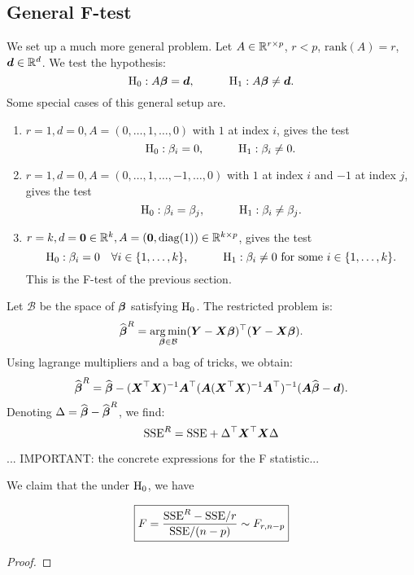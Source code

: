 \subsection{General F-test}
We set up a much more general problem. Let $A\in\mathbb{R}^{r\times p}$, $r<p$, $\mathrm{rank}(A)=r$, $\boldsymbol{d}\in\mathbb{R}^d$. We test the hypothesis:
$$
    \mathrm{H}_0 : A\boldsymbol{\beta} = \boldsymbol{d}, 
    \quad\quad\quad
    \mathrm{H}_1 : A\boldsymbol{\beta} \ne \boldsymbol{d}.
$$
Some special cases of this general setup are.
\begin{enumerate}[label=\textbullet]
    \item $r=1, d=0, A=(0, \dots, 1, \dots, 0)$ with $1$ at index $i$, gives the test 
    $$
        \mathrm{H}_0 : \beta_i = 0, 
        \quad\quad\quad
        \mathrm{H}_1 : \beta_i \ne 0.
    $$
    \item $r=1, d=0, A=(0, \dots, 1, \dots, -1, \dots, 0)$ with $1$ at index $i$ and $-1$ at index $j$, gives the test 
    $$
        \mathrm{H}_0 : \beta_i = \beta_j,
        \quad\quad\quad
        \mathrm{H}_1 : \beta_i \ne \beta_j.
    $$
    \item $r=k, d=\boldsymbol{0}\in\mathbb{R}^k, A=(\boldsymbol{0}, \mathrm{diag}(1))\in\mathbb{R}^{k\times p}$, gives the test 
    $$
        \mathrm{H}_0 : \beta_i = 0 \quad\forall i\in\{1,\dots,k\},
        \quad\quad\quad
        \mathrm{H}_1 : \beta_i \ne 0 \textrm{ for some } i\in\{1,\dots,k\}.
    $$
    This is the F-test of the previous section.
\end{enumerate}
Let $\mathcal{B}$ be the space of $\boldsymbol{\beta}$ satisfying $\mathrm{H}_0$. The restricted problem is:
$$
    \widehat{\boldsymbol{\beta}}^R = \operatorname*{arg\,min}_{\boldsymbol{\beta}\in\mathcal{B}}(\boldsymbol{Y}-\boldsymbol{X}\boldsymbol{\beta})^\top(\boldsymbol{Y}-\boldsymbol{X}\boldsymbol{\beta}).
$$
Using lagrange multipliers and a bag of tricks, we obtain:
$$
    \widehat{\boldsymbol{\beta}}^R = \widehat{\boldsymbol{\beta}} - (\boldsymbol{X}^\top\boldsymbol{X})^{-1}\boldsymbol{A}^\top(\boldsymbol{A}(\boldsymbol{X}^\top\boldsymbol{X})^{-1}\boldsymbol{A}^\top)^{-1}(\boldsymbol{A}\widehat{\boldsymbol{\beta}}-\boldsymbol{d}).
$$
Denoting $\Delta = \widehat{\boldsymbol{\beta}}-\widehat{\boldsymbol{\beta}}^R$, we find:
$$
    \mathrm{SSE}^R = \mathrm{SSE} + \Delta^\top\boldsymbol{X}^\top\boldsymbol{X}\Delta
$$

... IMPORTANT: the concrete expressions for the F statistic...

We claim that the under $\mathrm{H}_0$, we have

\begin{equation}
    \boxed{F = \frac{\mathrm{SSE}^R-\mathrm{SSE} / r}{\mathrm{SSE}/(n-p)} \sim F_{r, n-p}}    
\end{equation}

\begin{proof}
\end{proof}

